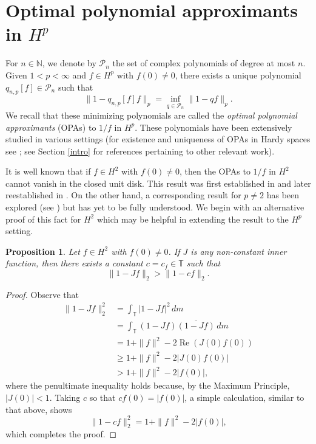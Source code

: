 \documentclass{article}
\theoremstyle{plain}
\numberwithin{Theorem}{section}
\numberwithin{equation}{section}
\theoremstyle{plain}
\newtheorem{Proposition}[Theorem]{Proposition}
\theoremstyle{definition}
\renewcommand{\geq}{\geqslant}
\newcommand{\T}{\mathbb{T}}
\newcommand{\N}{\mathbb{N}}
\begin{document}

\section{Optimal polynomial approximants in $H^p$}\label{opas}
For $n\in\N$, we denote by $\mathcal{P}_n$ the set of complex polynomials of degree at most $n$. Given $1<p<\infty$ and $f\in H^p$ with $f(0) \neq 0$, there exists a unique polynomial $q_{n,p}[f]\in\mathcal{P}_n$ such that
\[
\|1-q_{n,p}[f]f\|_p = \inf_{q\in\mathcal{P}_n}\|1-qf\|_p.
\]
We recall that these minimizing polynomials are called the \textit{optimal polynomial approximants} (OPAs) to $1/f$ in $H^p$. These polynomials have been extensively studied in various settings (for existence and uniqueness of OPAs in Hardy spaces see \cite[Section~2]{Cent}; see Section \ref{intro} for references pertaining to other relevant work). 

It is well known that if $f\in H^2$ with $f(0)\neq0$, then the OPAs to $1/f$ in $H^2$ cannot vanish in the closed unit disk. This result was first established in \cite{Chu1} and later reestablished in \cite{BKLSS_Lon}. On the other hand, a corresponding result for $p\neq2$ has been explored (see \cite{Cent, CCF, ChengFelder}) but has yet to be fully understood.  We begin with an alternative proof of this fact for $H^2$ which may be helpful in extending the result to the $H^p$ setting.


\begin{Proposition}\label{DI_p2}
Let $f \in H^2$ with $f(0) \neq 0$. If $J$ is any non-constant inner function, then there exists a constant $c = c_{f}\in\mathbb{T}$ such that 
\begin{equation*}
    \| 1 - J f \|_2 > \|1 - cf\|_2.
\end{equation*}

\end{Proposition}
\begin{proof}
Observe that 
    \begin{align*}
    \| 1 - J f \|_2^2
    &= \int_\T\left| 1 - Jf \right|^{2}\, dm\\
    &= \int_\T (1 - Jf)\overline{(1 - Jf)}\, dm\\
    &= 1+\|f\|^2-2\operatorname{Re}(J(0)f(0))\\
    &\geq 1+\|f\|^2-2|J(0)f(0)|\\
    &>1+\|f\|^2-2|f(0)|,
\end{align*}
where the penultimate inequality holds because, by the Maximum Principle, $|J(0)|<1$.
Taking $c$ so that $cf(0)=|f(0)|$, a simple calculation, similar to that above, shows 
\begin{equation*}
    \| 1 - c f \|_2^2=1+\|f\|^2-2|f(0)|,
\end{equation*}
which completes the proof.
\end{proof}
\end{document}
